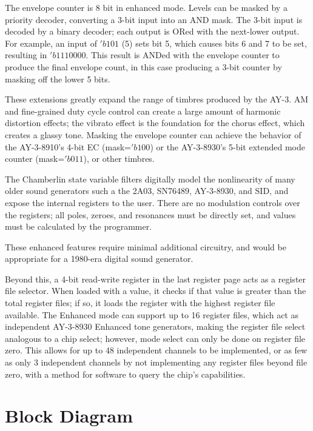 The envelope counter is 8 bit in enhanced mode.  Levels can be masked by a priority decoder, converting a 3-bit input into an AND mask.  The 3-bit input is decoded by a binary decoder; each output is ORed with the next-lower output.  For example, an input of $'b101$ (5) sets bit 5, which causes bits 6 and 7 to be set, resulting in $'b1110000$.  This result is ANDed with the envelope counter to produce the final envelope count, in this case producing a 3-bit counter by masking off the lower 5 bits.

These extensions greatly expand the range of timbres produced by the AY-3.  AM and fine-grained duty cycle control can create a large amount of harmonic distortion effects; the vibrato effect is the foundation for the chorus effect, which creates a glassy tone.  Masking the envelope counter can achieve the behavior of the AY-3-8910's 4-bit EC (mask=$'b100$) or the AY-3-8930's 5-bit extended mode counter (mask=$'b011$), or other timbres.

The Chamberlin state variable filters digitally model the nonlinearity of many older sound generators such a the 2A03, SN76489, AY-3-8930, and SID, and expose the internal registers to the user.  There are no modulation controls over the registers; all poles, zeroes, and resonances must be directly set, and values must be calculated by the programmer.

These enhanced features require minimal additional circuitry, and would be appropriate for a 1980-era digital sound generator.

Beyond this, a 4-bit read-write register in the last register page acts as a register file selector.  When loaded with a value, it checks if that value is greater than the total register files; if so, it loads the register with the highest register file available.  The Enhanced mode can support up to 16 register files, which act as independent AY-3-8930 Enhanced tone generators, making the register file select analogous to a chip select; however, mode select can only be done on register file zero.  This allows for up to 48 independent channels to be implemented, or as few as only 3 independent channels by not implementing any register files beyond file zero, with a method for software to query the chip's capabilities.

\section{Block Diagram}


